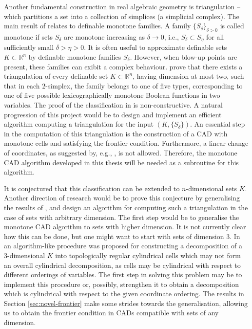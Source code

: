 \documentclass[
]{book}
\theoremstyle{definition}
\theoremstyle{definition}
\theoremstyle{definition}
\theoremstyle{definition}
\theoremstyle{remark}
\begin{document}
Another fundamental construction in real algebraic geometry is triangulation -- which partitions a set into a collection of simplices (a simplicial complex).
The main result of \citet{bgv15} relates to definable monotone families.
A family \(\{ S_\delta \}_{\delta >0}\) is called monotone if sets \(S_\delta\) are monotone
increasing as \(\delta \to 0\), i.e., \(S_\delta \subset S_\eta\) for all sufficiently small \(\delta > \eta >0\).
It is often useful to approximate definable sets \(K \subset \mathbb{R}^n\) by definable monotone families \(S_{\delta}\). However, when blow-up points are present, these families can exibit a complex behaviour.
\citet{bgv15} prove that there exists a triangulation of every definable set \(K \subset \mathbb{R}^n\), having dimension at most two, such that in each \(2\)-simplex, the family belongs to one of five types, corresponding to one of five possible lexicographically monotone Boolean functions in two variables.
The proof of the classification in \citet{bgv15} is non-constructive.
A natural progression of this project would be to design and implement an efficient
algorithm computing a triangulation for the input \((K, \{ S_\delta \})\).
An essential step in the computation of this triangulation is the construction of a CAD with monotone cells and satisfying the frontier condition. Furthermore, a linear change of coordinates, as suggested by, e.g., \citet{pianomovers1983}, is not allowed. Therefore, the monotone CAD algorithm developed in this thesis will be needed as a subroutine for this algorithm.

It is conjectured that this classification can be extended to \(n\)-dimensional sets \(K\).
Another direction of research would be to prove this conjecture by generalising the results of \citet{bgv15}, and design an algorithm for computing such a triangulation in the case of sets with arbitrary dimension.
The first step would be to generalise the monotone CAD algorithm to sets with higher dimension.
It is not currently clear how this can be done, but one might want to start with sets of dimension \(3\).
In \citet{bgvII} an algorithm-like procedure was proposed for constructing a decomposition of a 3-dimensional \(K\)
into topologically regular cylindrical cells which may not form an overall cylindrical decomposition, as cells may be cylindrical with respect to different orderings of variables.
The first step in solving this problem may be to implement this procedure or, possibly, strengthen it to obtain a decomposition which is cylindrical with respect to the given coordinate ordering.
The results in Section \ref{sec:novel-frontier} make some strides towards the generalisation, allowing us to obtain the frontier condition in CADs compatible with sets of any dimension.
\end{document}
